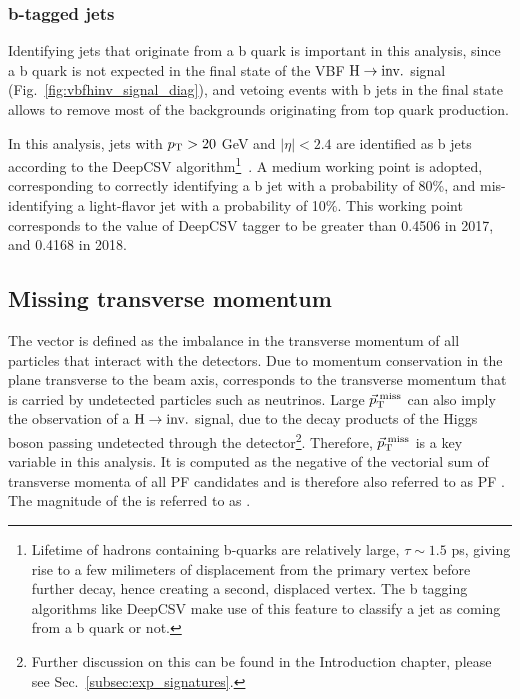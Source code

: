 \subsubsection{b-tagged jets}
\label{subsec:objects_bjets}

Identifying jets that originate from a b quark is important in this analysis, since a b quark is not expected in the
final state of the VBF $\textrm{H} \rightarrow \textrm{inv.}$ signal (Fig.~\ref{fig:vbfhinv_signal_diag}), 
and vetoing events with b jets in the final state allows to remove most of the 
backgrounds originating from top quark production.

In this analysis, jets with $p_{\textrm{T}} > 20$ GeV and $|\eta| < 2.4$ are identified as b jets according to the
DeepCSV algorithm\footnote{Lifetime of hadrons containing b-quarks are
relatively large, $\tau \sim 1.5$ ps, giving rise to a few milimeters of displacement from the primary vertex
before further decay, hence creating a second, displaced vertex. The b tagging algorithms like DeepCSV make use of
this feature to classify a jet as coming from a b quark or not.}~\cite{Sirunyan:2017ezt}. 
A medium working point is adopted, corresponding to correctly identifying a b jet with a
probability of 80\%, and mis-identifying a light-flavor jet with a probability of 10\%. This working point corresponds to the value of 
DeepCSV tagger to be greater than 0.4506 in 2017, and 0.4168 in 2018.

\subsection{Missing transverse momentum}
\label{subsec:objects_met_recoil}

The vector \ptvecmiss is defined as the imbalance in the transverse
momentum of all particles that interact with the detectors.
Due to momentum conservation in the plane transverse to the beam axis, \ptvecmiss
corresponds to the transverse momentum that is carried by undetected particles such as neutrinos.
Large $\vec{p}_{\textrm{T}}^{\;\textrm{miss}}$ can also imply the observation of a $\textrm{H} \rightarrow \textrm{inv.}$ signal, due to the decay products
of the Higgs boson passing undetected through the detector\footnote{Further discussion
on this can be found in the Introduction chapter, please see Sec.~\ref{subsec:exp_signatures}.}.
Therefore, $\vec{p}_{\textrm{T}}^{\;\textrm{miss}}$ is a key variable in this analysis.   
It is computed as the negative of the vectorial sum of transverse
momenta of all PF candidates and is therefore also referred to as PF \ptvecmiss.
The magnitude of the \ptvecmiss is referred to as \ptmiss.

